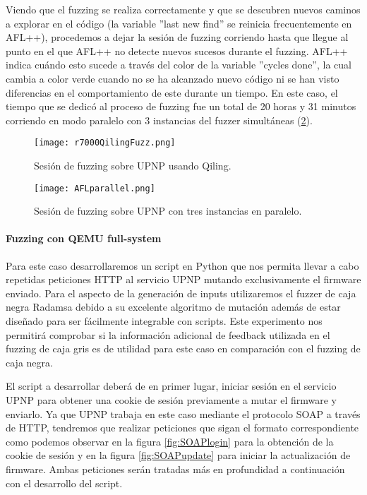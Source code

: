 Viendo que el fuzzing se realiza correctamente y que se descubren nuevos caminos a explorar en el código (la variable ''last new find'' se reinicia frecuentemente en AFL++), procedemos a dejar la 
sesión de fuzzing corriendo hasta que llegue al punto en el que AFL++ no detecte nuevos sucesos durante el fuzzing. AFL++ indica cuándo
esto sucede a través del color de la variable ''cycles done'', la cual cambia a color verde cuando no se ha alcanzado nuevo código 
ni se han visto diferencias en el comportamiento de este durante un tiempo. En este caso, el tiempo que se dedicó al proceso de fuzzing 
fue un total de 20 horas y 31 minutos corriendo en modo paralelo con 3 instancias del fuzzer simultáneas (\ref{fig:R7000parallel}).

\begin{figure}[H]
    \centering
    \texttt{[image: r7000QilingFuzz.png]}
    \caption{Sesión de fuzzing sobre UPNP usando Qiling.}
    \label{fig:R7000QilingFuzz}
\end{figure}

\begin{figure}[H]
    \centering
    \texttt{[image: AFLparallel.png]}
    \caption{Sesión de fuzzing sobre UPNP con tres instancias en paralelo.}
    \label{fig:R7000parallel}
\end{figure}

\paragraph{Fuzzing con QEMU full-system}
Para este caso desarrollaremos un script en Python que nos permita llevar a cabo repetidas peticiones HTTP
al servicio UPNP mutando exclusivamente el firmware enviado. Para el aspecto de la generación de
inputs utilizaremos el fuzzer de caja negra Radamsa\cite{radamsa} debido a su excelente algoritmo 
de mutación además de estar diseñado para ser fácilmente integrable con scripts. Este experimento nos 
permitirá comprobar si la información adicional de feedback utilizada en el fuzzing de caja gris es 
de utilidad para este caso en comparación con el fuzzing de caja negra.\bigskip

El script a desarrollar deberá de en primer lugar, iniciar sesión en el servicio UPNP para obtener una cookie de sesión
previamente a mutar el firmware y enviarlo. Ya que UPNP trabaja en este caso mediante el protocolo SOAP a través de HTTP,
tendremos que realizar peticiones que sigan el formato correspondiente como podemos observar en la figura \ref{fig:SOAPlogin}
para la obtención de la cookie de sesión y en la figura \ref{fig:SOAPupdate} para iniciar la actualización de firmware.
Ambas peticiones serán tratadas más en profundidad a continuación con el desarrollo del script.

